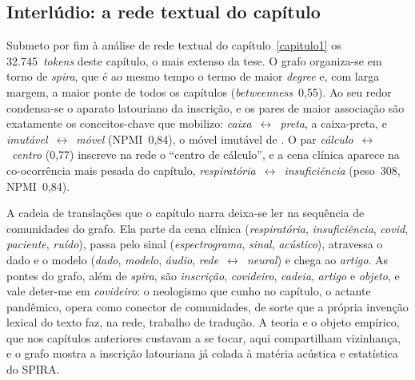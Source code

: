 %
%

\subsection*{Interlúdio: a rede textual do capítulo}

Submeto por fim à análise de rede textual do capítulo~\ref{capitulo1} os
32.745~\textit{tokens} deste capítulo, o mais extenso da tese. O
grafo organiza-se em torno de \textit{spira}, que é ao mesmo tempo o
termo de maior \textit{degree} e, com larga margem, a maior ponte de
todos os capítulos (\textit{betweenness}~0,55). Ao seu redor
condensa-se o aparato latouriano da inscrição, e os pares de maior
associação são exatamente os conceitos-chave que mobilizo:
\textit{caixa}~$\leftrightarrow$~\textit{preta}, a caixa-preta, e
\textit{imutável}~$\leftrightarrow$~\textit{móvel} (NPMI~0,84), o
móvel imutável de \textcite{Latour1986Visualization}. O par
\textit{cálculo}~$\leftrightarrow$~\textit{centro} (0,77) inscreve
na rede o \enquote{centro de cálculo}, e a cena clínica aparece na
co-ocorrência mais pesada do capítulo,
\textit{respiratória}~$\leftrightarrow$~\textit{insuficiência}
(peso~308, NPMI~0,84).

A cadeia de translações que o capítulo narra deixa-se ler na sequência
de comunidades do grafo. Ela parte da cena clínica (\textit{respiratória},
\textit{insuficiência}, \textit{covid}, \textit{paciente},
\textit{ruído}), passa pelo sinal (\textit{espectrograma},
\textit{sinal}, \textit{acústico}), atravessa o dado e o modelo
(\textit{dado}, \textit{modelo}, \textit{áudio},
\textit{rede}~$\leftrightarrow$~\textit{neural}) e chega ao
\textit{artigo}. As pontes do grafo, além de \textit{spira}, são
\textit{inscrição}, \textit{covideiro}, \textit{cadeia}, \textit{artigo}
e \textit{objeto}, e vale deter-me em \textit{covideiro}: o neologismo
que cunho no capítulo, o actante pandêmico, opera como conector de
comunidades, de sorte que a própria invenção lexical do texto faz, na
rede, trabalho de tradução. A teoria e o objeto empírico, que nos
capítulos anteriores custavam a se tocar, aqui compartilham vizinhança,
e o grafo mostra a inscrição latouriana já colada à matéria acústica e
estatística do SPIRA.


